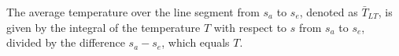 The average temperature over the line segment from \( s_a \) to \( s_e \), denoted as \( \bar{T}_{LT} \), is given by the integral of the temperature \( T \) with respect to \( s \) from \( s_a \) to \( s_e \), divided by the difference \( s_a - s_e \), which equals \( T \).